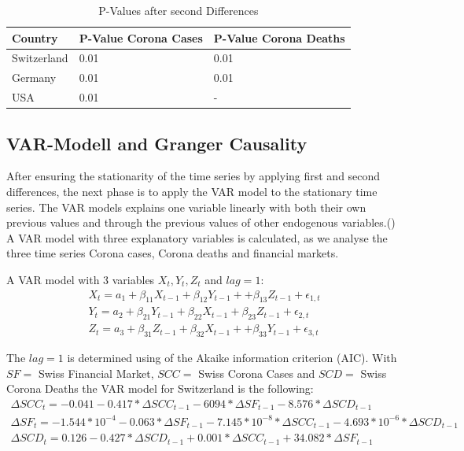 \documentclass[11pt]{article}
\begin{document}
\begin{table}[h!]
\centering
\caption{P-Values after second Differences}
\label{tab:p-values-second-diff}
\begin{tabular}{|l|l|l|}
\hline
\textbf{Country} &\textbf{P-Value Corona Cases} & \textbf{P-Value Corona Deaths}  \\ \hline
Switzerland      & 0.01 & 0.01         \\ \hline
Germany          & 0.01 & 0.01             \\ \hline
USA              & 0.01 & -            \\ \hline
\end{tabular}
\end{table}

\subsection{VAR-Modell and Granger Causality}
After ensuring the stationarity of the time series by applying first and second differences, the next phase is to apply the VAR model to the stationary time series. The VAR models explains one variable linearly with both their own previous values and through the previous values of other endogenous variables.(\cite{PowerPoi49:online}) A VAR model with three explanatory variables is calculated, as we analyse the three time series Corona cases, Corona deaths and financial markets.

A VAR model with 3 variables $X_{t},Y_{t}, Z_{t}$ and $lag = 1$:
$$
\begin{array}{l}
X_{t}=a_{1}+\beta_{11} X_{t-1}+\beta_{12} Y_{t-1}++\beta_{13} Z_{t-1}+\epsilon_{1, t}\\
Y_{t}=a_{2}+\beta_{21} Y_{t-1}+\beta_{22} X_{t-1}+\beta_{23} Z_{t-1}+\epsilon_{2, t} \\
Z_{t}=a_{3}+\beta_{31} Z_{t-1}+\beta_{32} X_{t-1}++\beta_{33} Y_{t-1}+\epsilon_{3, t}
\end{array}
$$

The $ lag = 1 $ is determined using of the Akaike information criterion (AIC). With $SF =$ Swiss Financial Market, $SCC =$ Swiss Corona Cases and $SCD =$ Swiss Corona Deaths the VAR model for Switzerland is the following:
$$
\begin{array}{l}
\Delta SCC_{t}= -0.041 - 0.417 * \Delta SCC_{t-1} - 6094 * \Delta SF_{t-1} -8.576 * \Delta SCD_{t-1}\\
\Delta SF_{t}= -1.544* 10^{-4}  - 0.063 * \Delta SF_{t-1} -7.145*10^{-8} * \Delta SCC_{t-1} - 4.693*10^{-6}  * \Delta SCD_{t-1}\\
\Delta SCD_{t}= 0.126 - 0.427 * \Delta SCD_{t-1} + 0.001 * \Delta SCC_{t-1} + 34.082  * \Delta SF_{t-1}
\end{array}
$$
\end{document}

